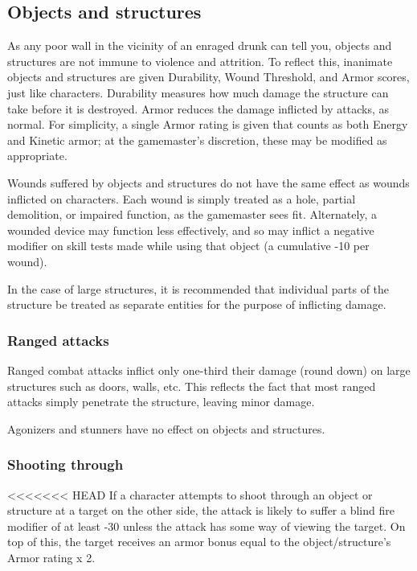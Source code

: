 \subsection{Objects and structures} \label{sec:objects-structures} 

As any poor wall in the vicinity of an enraged drunk can tell you, objects and structures are not immune to violence and attrition. To reflect this, inanimate objects and structures are given Durability, Wound Threshold, and Armor scores, just like characters. Durability measures how much damage the structure can take before it is destroyed. Armor reduces the damage inflicted by attacks, as normal. For simplicity, a single Armor rating is given that counts as both Energy and Kinetic armor; at the gamemaster’s discretion, these may be modified as appropriate. 

Wounds suffered by objects and structures do not have the same effect as wounds inflicted on characters. Each wound is simply treated as a hole, partial demolition, or impaired function, as the gamemaster sees fit. Alternately, a wounded device may function less effectively, and so may inflict a negative modifier on skill tests made while using that object (a cumulative -10 per wound). 

In the case of large structures, it is recommended that individual parts of the structure be treated as separate entities for the purpose of inflicting damage. 

\subsubsection{Ranged attacks} 

Ranged combat attacks inflict only one-third their damage (round down) on large structures such as doors, walls, etc. This reflects the fact that most ranged attacks simply penetrate the structure, leaving minor damage. 

Agonizers and stunners have no effect on objects and structures. 

\subsubsection{Shooting through} 

<<<<<<< HEAD If a character attempts to shoot through an object or structure at a target on the other side, the attack is likely to suffer a blind fire modifier of at least -30 unless the attack has some way of viewing the target. On top of this, the target receives an armor bonus equal to the object/structure’s Armor rating x 2. 


